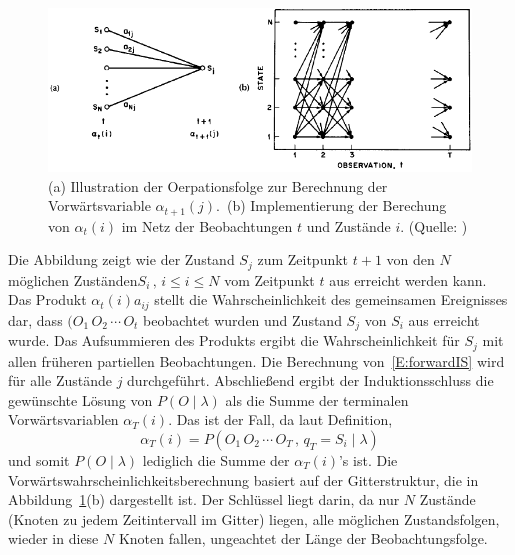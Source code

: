 \begin{figure}[htb]
\centering
\includegraphics[width=\textwidth]{img/markov/forward_variable.png}
\caption[(a) Illustration der Oerpationsfolge zur Berechnung der Vorw\"artsvariable.(b) Implementierung der Berechung von  $\alpha_t(i)$ im Netz der Beobachtungen $t$ und Zust\"ande $i$.]{(a) Illustration der Oerpationsfolge zur Berechnung der Vorw\"artsvariable $\alpha_{t+1}(j)$.~(b) Implementierung der Berechung von $\alpha_t(i)$ im Netz der Beobachtungen $t$ und Zust\"ande $i$. (Quelle: )}
\label{fig:ForwardVariable}
\end{figure}
Die Abbildung zeigt wie der Zustand $S_j$ zum Zeitpunkt $t + 1$ von den $N$ m\"oglichen Zust\"anden$S_i \,,\, i \leq i \leq N$ vom Zeitpunkt $t$ aus erreicht werden kann. Das Produkt $\alpha_t(i) a_{ij}$ stellt die Wahrscheinlichkeit des gemeinsamen Ereignisses dar, dass $(O_1 \, O_2 \, \cdots \, O_t$ beobachtet wurden und Zustand $S_j$ von $S_i$ aus erreicht wurde. Das Aufsummieren des Produkts ergibt die Wahrscheinlichkeit f\"ur $S_j$ mit allen fr\"uheren partiellen Beobachtungen. Die Berechnung von~\ref{E:forwardIS} wird f\"ur alle Zust\"ande $j$ durchgef\"uhrt. Abschlie\ss end ergibt der Induktionsschluss die gew\"unschte L\"osung von $P( O \mid \lambda)$ als die Summe der terminalen Vorw\"artsvariablen $\alpha_T(i)$. Das ist der Fall, da laut Definition,
\begin{equation}
\alpha_T(i) = P (O_1 \, O_2 \, \cdots \, O_T \, , \, q_T = S_i \mid \lambda)
\end{equation}
und somit $P (O \mid \lambda)$ lediglich die Summe der $\alpha_T(i)$'s ist.
\newline
Die Vorw\"artswahrscheinlichkeitsberechnung basiert auf der Gitterstruktur, die in Abbildung~\ref{fig:ForwardVariable}(b) dargestellt ist. Der Schl\"ussel liegt darin, da nur $N$ Zust\"ande (Knoten zu jedem Zeitintervall im Gitter) liegen, alle m\"oglichen Zustandsfolgen, wieder in diese $N$ Knoten fallen, ungeachtet der L\"ange der Beobachtungsfolge.
